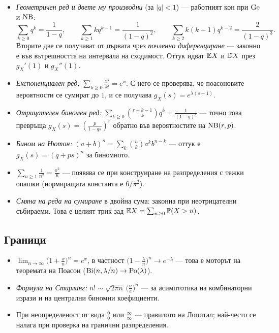 \begin{itemize}\itemsep3pt
  \item \emph{Геометричен ред и двете му производни} (за $|q|<1$) — работният кон при
        $\operatorname{Ge}$ и $\operatorname{NB}$:
        \[
          \sum_{k \ge 0} q^k = \frac{1}{1-q}, \qquad
          \sum_{k \ge 1} k q^{k-1} = \frac{1}{(1-q)^2}, \qquad
          \sum_{k \ge 2} k(k-1) q^{k-2} = \frac{2}{(1-q)^3} .
        \]
        Вторите две се получават от първата чрез \emph{почленно диференциране} — законно е
        във вътрешността на интервала на сходимост. Оттук идват $\mathbb{E} X$ и $\mathbb{D} X$ през
        $g_X'(1)$ и $g_X''(1)$.
  \item \emph{Експоненциален ред:} $\displaystyle \sum_{k \ge 0} \frac{x^k}{k!} = e^{x}$.
        С него се проверява, че поасоновите вероятности се сумират до $1$, и се получава
        $g_X(s) = e^{\lambda(s-1)}$.
  \item \emph{Отрицателен биномен ред:}
        $\displaystyle \sum_{k \ge 0} \binom{r+k-1}{k} q^k = \frac{1}{(1-q)^r}$ —
        точно това превръща $g_X(s) = \left(\frac{p}{1-qs}\right)^r$ обратно във
        вероятностите на $\operatorname{NB}(r,p)$.
  \item \emph{Бином на Нютон:} $(a+b)^n = \sum_k \binom{n}{k}a^k b^{n-k}$ — оттук е
        $g_X(s) = (q+ps)^n$ за биномното.
  \item $\displaystyle \sum_{n \ge 1} \frac{1}{n^2} = \frac{\pi^2}{6}$ — появява се при
        конструиране на разпределения с тежки опашки (нормиращата константа е $6/\pi^2$).
  \item \emph{Смяна на реда на сумиране} в двойна сума: законна при неотрицателни
        събираеми. Това е целият трик зад $\mathbb{E} X = \sum_{n \ge 0} \mathbb{P}(X>n)$.
\end{itemize}

\subsection*{Граници}

\begin{itemize}\itemsep3pt
  \item $\displaystyle \lim_{n \to \infty}\Big(1 + \frac{x}{n}\Big)^{n} = e^{x}$,\;
        в частност $\big(1-\frac{\lambda}{n}\big)^n \to e^{-\lambda}$ — това е моторът на
        теоремата на Поасон ($\operatorname{Bi}(n,\lambda/n) \to \operatorname{Po}(\lambda)$).
  \item \emph{Формула на Стирлинг:} $n! \sim \sqrt{2\pi n}\,\big(\frac{n}{e}\big)^{n}$ —
        за асимптотика на комбинаторни изрази и на централни биномни коефициенти.
  \item При неопределеност от вида $\frac{0}{0}$ или $\frac{\infty}{\infty}$ —
        правилото на Лопитал; най-често се налага при проверка на гранични разпределения.
\end{itemize}

